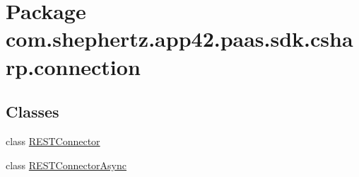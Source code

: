 \hypertarget{namespacecom_1_1shephertz_1_1app42_1_1paas_1_1sdk_1_1csharp_1_1connection}{\section{Package com.\+shephertz.\+app42.\+paas.\+sdk.\+csharp.\+connection}
\label{namespacecom_1_1shephertz_1_1app42_1_1paas_1_1sdk_1_1csharp_1_1connection}
}
\subsection*{Classes}
\begin{DoxyCompactItemize}
\item 
class \hyperlink{classcom_1_1shephertz_1_1app42_1_1paas_1_1sdk_1_1csharp_1_1connection_1_1_r_e_s_t_connector}{R\+E\+S\+T\+Connector}
\item 
class \hyperlink{classcom_1_1shephertz_1_1app42_1_1paas_1_1sdk_1_1csharp_1_1connection_1_1_r_e_s_t_connector_async}{R\+E\+S\+T\+Connector\+Async}
\end{DoxyCompactItemize}
